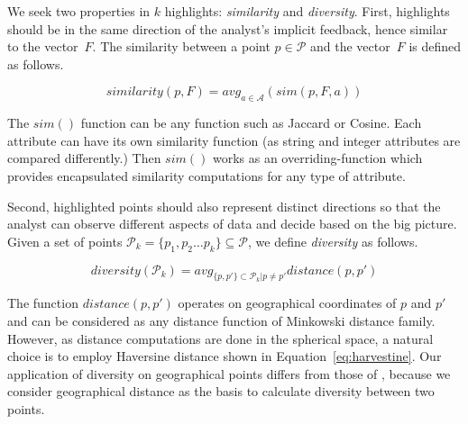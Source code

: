 \documentclass[sigconf,edbt]{acmart-edbt2019}
\begin{document}
\vspace{2pt}
We seek two properties in $k$ highlights: {\em similarity} and {\em diversity}. First, highlights should be in the same direction of the analyst's implicit feedback, hence similar to the vector~$F$. The similarity between a point $p \in \mathcal{P}$ and the vector~$F$ is defined as follows.

\begin{equation}
       \label{eq:rel}
       \mathit{similarity}(p,F) = \mathit{avg}_{a \in \mathcal{A}}(\mathit{sim(p, F, a)})
\end{equation}

\vspace{2pt}
The $\mathit{sim}()$ function can be any function such as Jaccard or Cosine. Each attribute can have its own similarity function (as string and integer attributes are compared differently.) Then $\mathit{sim}()$ works as an overriding-function which provides encapsulated similarity computations for any type of attribute.

\vspace{2pt}
Second, highlighted points should also represent distinct directions so that the analyst can observe different aspects of data and decide based on the big picture. Given a set of points $\mathcal{P}_k =  \{ p_1, p_2 \dots p_k \}  \subseteq{\mathcal P} $, we define { \em diversity} as follows.

\begin{equation}
       \label{eq:divs}
       \mathit{diversity}(\mathcal{P}_k) = \mathit{avg}_{\{p, p'\} \subset \mathcal{P}_k | p \neq p' } \mathit{distance}(p,p')
\end{equation} 

\vspace{2pt}
The function $\mathit{distance}(p,p')$ operates on geographical coordinates of $p$ and $p'$ and can be considered as any distance function of Minkowski distance family. However, as distance computations are done in the spherical space, a natural choice is to employ Haversine distance shown in Equation~\ref{eq:harvestine}. Our application of diversity on geographical points differs from those of \cite{DrosouP12}, because we consider geographical distance as the basis to calculate diversity between two points.
\end{document}
